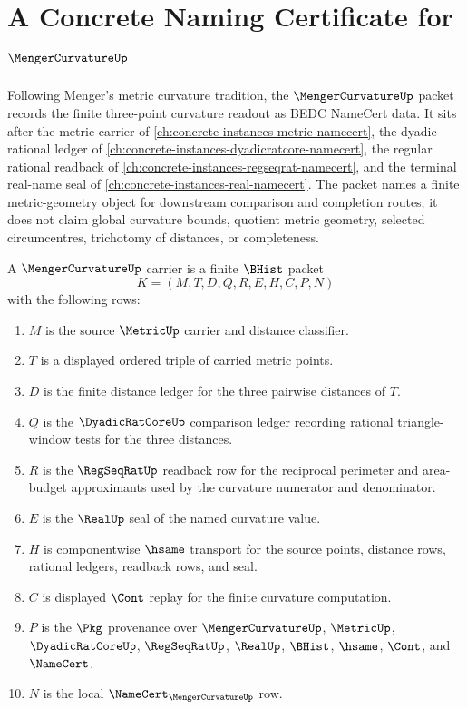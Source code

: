 \chapter{A Concrete Naming Certificate for $\MengerCurvatureUp$}
\label{ch:concrete-instances-menger-curvature-namecert}

Following Menger's metric curvature tradition, the $\MengerCurvatureUp$
packet records the finite three-point curvature readout as BEDC NameCert data.
It sits after the metric carrier of
\autoref{ch:concrete-instances-metric-namecert}, the dyadic rational ledger of
\autoref{ch:concrete-instances-dyadicratcore-namecert}, the regular rational
readback of \autoref{ch:concrete-instances-regseqrat-namecert}, and the
terminal real-name seal of \autoref{ch:concrete-instances-real-namecert}. The
packet names a finite metric-geometry object for downstream comparison and
completion routes; it does not claim global curvature bounds, quotient metric
geometry, selected circumcentres, trichotomy of distances, or completeness.

\begin{definition}
\label{def:menger-curvature-carrier}
A $\MengerCurvatureUp$ carrier is a finite $\BHist$ packet
$$
K=(M,T,D,Q,R,E,H,C,P,N)
$$
with the following rows:
\begin{enumerate}
\item $M$ is the source $\MetricUp$ carrier and distance classifier.
\item $T$ is a displayed ordered triple of carried metric points.
\item $D$ is the finite distance ledger for the three pairwise distances of
$T$.
\item $Q$ is the $\DyadicRatCoreUp$ comparison ledger recording rational
triangle-window tests for the three distances.
\item $R$ is the $\RegSeqRatUp$ readback row for the reciprocal perimeter and
area-budget approximants used by the curvature numerator and denominator.
\item $E$ is the $\RealUp$ seal of the named curvature value.
\item $H$ is componentwise $\hsame$ transport for the source points, distance
rows, rational ledgers, readback rows, and seal.
\item $C$ is displayed $\Cont$ replay for the finite curvature computation.
\item $P$ is the $\Pkg$ provenance over $\MengerCurvatureUp$, $\MetricUp$,
$\DyadicRatCoreUp$, $\RegSeqRatUp$, $\RealUp$, $\BHist$, $\hsame$, $\Cont$,
and $\NameCert$.
\item $N$ is the local $\NameCert_{\MengerCurvatureUp}$ row.
\end{enumerate}
\end{definition}

